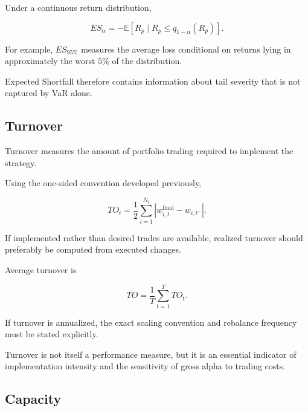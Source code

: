 \documentclass[11pt,a4paper]{article}
\begin{document}
Under a continuous return distribution,

\begin{equation}
\boxed{
ES_{\alpha}
=
-
\mathbb{E}
\left[
R_p
\mid
R_p
\leq
q_{1-\alpha}(R_p)
\right].
}
\end{equation}

For example, $ES_{95\%}$ measures the average loss conditional on returns lying
in approximately the worst $5\%$ of the distribution.

Expected Shortfall therefore contains information about tail severity that is
not captured by VaR alone.


\subsection{Turnover}

Turnover measures the amount of portfolio trading required to implement the
strategy.

Using the one-sided convention developed previously,

\begin{equation}
\boxed{
TO_t
=
\frac{1}{2}
\sum_{i=1}^{N_t}
\left|
w_{i,t}^{\mathrm{final}}
-
w_{i,t^-}
\right|.
}
\end{equation}

If implemented rather than desired trades are available, realized turnover
should preferably be computed from executed changes.

Average turnover is

\begin{equation}
\boxed{
\overline{TO}
=
\frac{1}{T}
\sum_{t=1}^{T}
TO_t.
}
\end{equation}

If turnover is annualized, the exact scaling convention and rebalance frequency
must be stated explicitly.

Turnover is not itself a performance measure, but it is an essential indicator
of implementation intensity and the sensitivity of gross alpha to trading
costs.


\subsection{Capacity}
\end{document}

